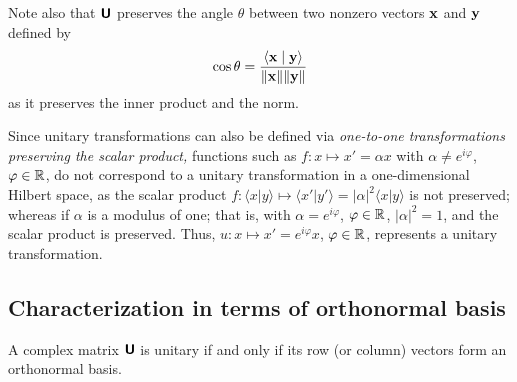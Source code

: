 Note also that $\textsf{\textbf{U}}$ preserves the angle $\theta$ between two nonzero vectors ${\bf x}$ and ${\bf y}$  defined by
\begin{equation}
\begin{split}
\cos \theta = \frac{ \langle {\bf x} \mid {\bf y} \rangle } {\|{\bf x}\| \| {\bf y}\| }
\end{split}
\label{2016-m-ch-unitanglepres}
\end{equation}
as it preserves the inner product and the norm.

{\color{blue}
\bexample
Since unitary transformations can also be defined via {\em one-to-one transformations preserving the scalar product,}
functions such as
$f: x \mapsto x' =\alpha x$ with $\alpha \neq e^{i\varphi}$, $\varphi \in {\Bbb R}$,
do not correspond to a  unitary transformation in a one-dimensional Hilbert space, as
the scalar product $f:
\langle x \vert y \rangle
\mapsto
\langle x'\vert y'\rangle = \vert \alpha \vert^2 \langle x\vert y\rangle$
is not preserved; whereas if $\alpha$ is a modulus of one; that is,
with $\alpha = e^{i\varphi}$, $\varphi \in {\Bbb R}$,
$\vert \alpha \vert^2=1$, and the scalar product is preserved.
Thus, $u: x \mapsto x' =e^{i\varphi} x$, $\varphi \in {\Bbb R}$,
represents a unitary transformation.
\eexample
}




\subsection {Characterization in terms of orthonormal basis}
\label{2012-m-ch-citoob}


A complex matrix $\textsf{\textbf{U}}$ is unitary if and only if its row (or column) vectors form
an orthonormal basis.


